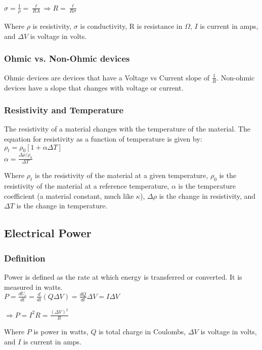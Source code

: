 \vbox{
    \center
    $\sigma = \frac{1}{\rho} = \frac{\ell}{RA} \Longrightarrow R = \frac{\ell}{R\sigma}$
}
\vspace{16pt}

Where $\rho$ is resistivity, $\sigma$ is conductivity, R is resistance in $\Omega$, $I$ is current in amps, and $\Delta V$ is voltage in volts.

\subsubsection*{Ohmic vs. Non-Ohmic devices}
\hspace{.5cm} Ohmic devices are devices that have a Voltage vs Current slope of $\frac{1}{R}$. Non-ohmic devices have a slope that changes with voltage or current.\\

\subsubsection*{Resistivity and Temperature}

\hspace{.5cm} The resistivity of a material changes with the temperature of the material. The equation for resistivity as a function of temperature is given by:\\

\vbox{
    \center
    $\rho_t = \rho_0[1+\alpha\Delta T]$\\
    \vspace{12pt}
    $\alpha = \frac{\Delta \rho/\rho_0}{\Delta T}$
}
\vspace{12pt}

Where $\rho_t$ is the resistivity of the material at a given temperature, $\rho_0$ is the resistivity of the material at a reference temperature, $\alpha$ is the temperature coefficient (a material constant, much like $\kappa$), $\Delta \rho$ is the change in resistivity, and $\Delta T$ is the change in temperature.\\

\vspace{12pt}
\hrulefill

\begin{center}
\subsection*{Electrical Power}
\end{center}

\subsubsection*{Definition}
\hspace{.5cm} Power is defined as the rate at which energy is transferred or converted. It is measured in watts.\\
\vbox{
    \center
    $P = \frac{dU_e}{dt} = \frac{d}{dt} (Q\Delta V) = \frac{dQ}{dt}\Delta V = I\Delta V$
}

\vbox{
    \center
    $\Longrightarrow P = I^2R = \frac{(\Delta V)^2}{R}$
}
\vspace{12pt}

Where $P$ is power in watts, $Q$ is total charge in Coulombs, $\Delta V$ is voltage in volts, and $I$ is current in amps.